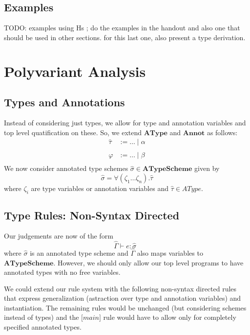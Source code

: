\documentclass[a4wide,12pt]{article}
\theoremstyle{definition}
\theoremstyle{plain}
\theoremstyle{remark}
\def\AType{\mathbf{AType}}
\def\Annot{\mathbf{Annot}}
\def\ATypeScheme{\mathbf{ATypeScheme}}
\def\htau{\hat{\tau}}
\def\hsigma{\hat{\sigma}}
\def\HGamma{\hat{\Gamma}}
\def\judge#1#2#3{#1 \vdash #2 : #3\;\;}
\begin{document}
\subsection{Examples}

TODO: examples using Hs ; do the examples in the handout and also one that should be used in other sections. for this last one, also present a type derivation.

\section{Polyvariant Analysis}

\subsection{Types and Annotations}

Instead of considering just types, we allow for type and annotation variables and top level quatification
on these. So, we extend $\AType$ and $\Annot$ as follows:
\begin{eqnarray*}
\htau & := \ldots  \mid \alpha \\ 
\\
\varphi & := \ldots  \mid \beta \\
\end{eqnarray*}
We now consider annotated type schemes $\hsigma \in \ATypeScheme$ given by
\[\hsigma = \forall (\zeta_1 \ldots \zeta_n). \htau\]
where $\zeta_i$ are type variables or annotation variables and $\htau \in AType$.

\subsection{Type Rules: Non-Syntax Directed}

Our judgements are now of the form
\[\judge{\HGamma}{e}{\hsigma}\]
where $\hsigma$ is an annotated type scheme and $\HGamma$ also maps variables
to $\ATypeScheme$. However, we should only allow our top level
programs to have annotated types with no free variables.

We could extend our rule system with the following non-syntax directed rules that
express generalization (astraction over type and annotation variables) and
instantiation. The remaining rules would be unchanged (but considering schemes
instead of types) and the $\lbrack main \rbrack$ rule would have to allow only
for completely specified annotated types.
\end{document}
